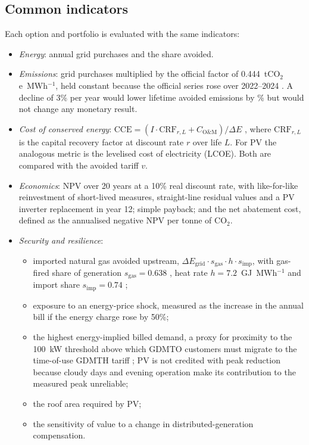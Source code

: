 \documentclass[preprint,12pt,authoryear]{elsarticle}
\begin{document}
\subsection{Common indicators}
Each option and portfolio is evaluated with the same indicators:
\begin{itemize}
\item \emph{Energy}: annual grid purchases and the share avoided.
\item \emph{Emissions}: grid purchases multiplied by the official factor of 0.444~tCO$_2$e~MWh$^{-1}$, held constant because the official series rose over 2022--2024 \citep{cre2023fesen2022,cre2024fesen2023,semarnat2025fesen}. A decline of 3\% per year would lower lifetime avoided emissions by \nEFTrendDrop\% but would not change any monetary result.
\item \emph{Cost of conserved energy}: $\mathrm{CCE} = (I\cdot\mathrm{CRF}_{r,L} + C_{\mathrm{O\&M}})/\Delta E$ \citep{meier1982}, where $\mathrm{CRF}_{r,L}$ is the capital recovery factor at discount rate $r$ over life $L$. For PV the analogous metric is the levelised cost of electricity (LCOE). Both are compared with the avoided tariff $v$.
\item \emph{Economics}: NPV over 20 years at a 10\% real discount rate, with like-for-like reinvestment of short-lived measures, straight-line residual values and a PV inverter replacement in year 12; simple payback; and the net abatement cost, defined as the annualised negative NPV per tonne of CO$_2$.
\item \emph{Security and resilience}:
  \begin{itemize}
  \item imported natural gas avoided upstream, $\Delta E_{\mathrm{grid}}\cdot s_{\mathrm{gas}}\cdot h\cdot s_{\mathrm{imp}}$, with gas-fired share of generation $s_{\mathrm{gas}}=0.638$ \citep{sener2025plan}, heat rate $h=7.2$~GJ~MWh$^{-1}$ and import share $s_{\mathrm{imp}}=0.74$ \citep{eia2025mexico};
  \item exposure to an energy-price shock, measured as the increase in the annual bill if the energy charge rose by 50\%;
  \item the highest energy-implied billed demand, a proxy for proximity to the 100~kW threshold above which GDMTO customers must migrate to the time-of-use GDMTH tariff \citep{cfe2026gdmto}; PV is not credited with peak reduction because cloudy days and evening operation make its contribution to the measured peak unreliable;
  \item the roof area required by PV;
  \item the sensitivity of value to a change in distributed-generation compensation.
  \end{itemize}
\end{itemize}
\end{document}
